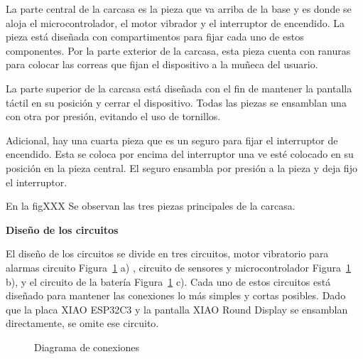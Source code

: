 \documentclass[
  letterpaper,
  DIV=11,
  numbers=noendperiod]{scrreport}
\begin{document}
La parte central de la carcasa es la pieza que va arriba de la base y es
donde se aloja el microcontrolador, el motor vibrador y el interruptor
de encendido. La pieza está diseñada con compartimentos para fijar cada
uno de estos componentes. Por la parte exterior de la carcasa, esta
pieza cuenta con ranuras para colocar las correas que fijan el
dispositivo a la muñeca del usuario.

La parte superior de la carcasa está diseñada con el fin de mantener la
pantalla táctil en su posición y cerrar el dispositivo. Todas las piezas
se ensamblan una con otra por presión, evitando el uso de tornillos.

Adicional, hay una cuarta pieza que es un seguro para fijar el
interruptor de encendido. Esta se coloca por encima del interruptor una
ve esté colocado en su posición en la pieza central. El seguro ensambla
por presión a la pieza y deja fijo el interruptor.

En la figXXX Se observan las tres piezas principales de la carcasa.

\textbf{Diseño de los circuitos}

El diseño de los circuitos se divide en tres circuitos, motor vibratorio
para alarmas circuito Figura~\ref{fig-conexiones} a) , circuito de
sensores y microcontrolador Figura~\ref{fig-conexiones} b), y el
circuito de la batería Figura~\ref{fig-conexiones} c). Cada uno de estos
circuitos está diseñado para mantener las conexiones lo más simples y
cortas posibles. Dado que la placa XIAO ESP32C3 y la pantalla XIAO Round
Display se ensamblan directamente, se omite ese circuito.

\begin{figure}


\caption{\label{fig-conexiones}Diagrama de conexiones}

\end{figure}%
\end{document}
